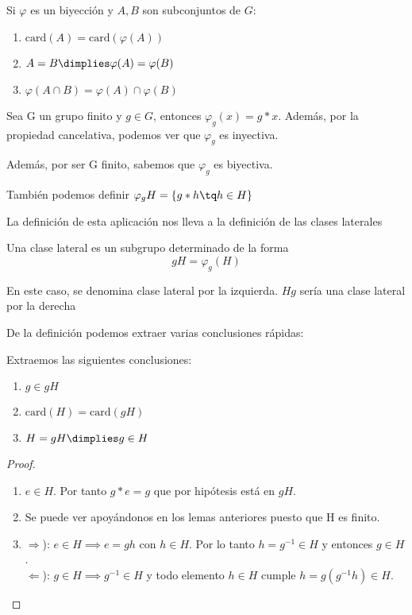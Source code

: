 \documentclass[nochap]{apuntes}
\begin{document}
  \begin{lemma}
   Si $\varphi$  es un biyección y $A, B$ son subconjuntos de $G$:
   \begin{enumerate}
    \item $\text{card}(A)=\text{card}(\varphi(A))$
    \item $A=B \dimplies \varphi(A)=\varphi(B)$
    \item $\varphi(A\cap B)=\varphi(A)\cap\varphi(B)$
   \end{enumerate}
  \end{lemma}
  
  \begin{lemma}
   Sea G un grupo finito y $g \in G$, entonces $\varphi_{g}(x)=g\ast x$. Además, por la propiedad cancelativa, podemos ver que $\varphi_{g}$ es inyectiva.
   
   Además, por ser G finito, sabemos que $\varphi_{g}$ es biyectiva.
  \end{lemma}
  También podemos definir $\varphi_{g} H=\{g\ast h\tq h\in H\}$
  
  La definición de esta aplicación nos lleva a la definición de las clases laterales 
  
  \begin{defn} Una clase lateral es un subgrupo determinado de la forma
  \[  gH=\varphi_{g}(H) \]
  
  En este caso, se denomina clase lateral por la izquierda. $Hg$ sería una clase lateral por la derecha
  \end{defn}
  
  De la definición podemos extraer varias conclusiones rápidas:

  \begin{corol} 
  \label{corol1}
  Extraemos las siguientes conclusiones:
   \begin{enumerate}
    \item $g \in gH$
    \item $\text{card}(H)=\text{card}(gH)$
    \item $H=gH \dimplies g \in H$ 
   \end{enumerate}
  \end{corol}

  \begin{proof}
   \begin{enumerate}
    \item $e \in  H$. Por tanto $g\ast e =g$ que por hipótesis está en $gH$.
    \item Se puede ver apoyándonos en los lemas anteriores puesto que H es finito.
    \item $\Rightarrow$):  $e \in H \implies e=gh$ con $h \in H$. Por lo tanto $h=g^{-1} \in H$ y entonces $g \in H$.\\
	  $\Leftarrow$):  $g \in H \implies g^{-1}\in H$ y todo elemento $h \in H$ cumple $h=g(g^{-1}h)\in H$.
   \end{enumerate}
  \end{proof}
  
\end{document}
